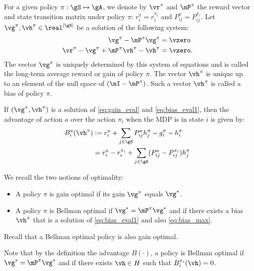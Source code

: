 For a given policy $\pi:\gS\mapsto\gA$, we denote by $\vr^\pi$ and $\mP^\pi$ the reward vector and state transition matrix under policy $\pi$: $r^\pi_i=r^{\pi_i}_{i}$ and $P^\pi_{ij} = P^{\pi_i}_{ij}$. Let $\vg^\pi,\vh^\pi\in\real^{\vert \gS\vert}$ be a solution of the following system:
\begin{align}
    \vg^\pi - \mP^{\pi}\vg^\pi &=\vzero \label{eq:gain_eval}\\
    \vr^{\pi}  - \vg^\pi+\mP^{\pi}\vh^\pi  -\vh^\pi &= \vzero \label{eq:bias_eval1}.
\end{align}
The vector $\vg^\pi$ is uniquely determined by this system of equations and is called the long-term average reward or gain of policy $\pi$. The vector $\vh^\pi$ is unique up to an element of the null space of $(\mI-\mP^\pi)$. Such a vector $\vh^\pi$ is called a bias of policy $\pi$.

If $(\vg^\pi, \vh^\pi)$ is a solution of \eqref{eq:gain_eval} and \eqref{eq:bias_eval1}, then the advantage of action $a$ over the action $\pi_i$ when the MDP is in state $i$ is given by:
\begin{align*}
    B^a_i(\vh^\pi) &:=r^a_i +\sum_{j\in\gS}P^a_{ij}h^\pi_j -g^{\pi}_i -h^\pi_i\\
    &= r^a_i - r^{\pi_i}_i +\sum_{j\in\gS}(P^a_{ij}-P^{\pi_i}_{ij})h^\pi_j
\end{align*}

We recall the two notions of optimality:
\begin{itemize}
    \item A policy $\pi$ is gain optimal if its gain $\vg^\pi$ equals $\vg^*$.
    \item A policy $\pi$ is Bellman optimal if $\vg^*=\mP^\pi \vg^*$ and if there exists a bias $\vh^\pi$ that is a solution of \eqref{eq:bias_eval1} and also \eqref{eq:bias_max}.
\end{itemize}
Recall that a Bellman optimal policy is also gain optimal.

Note that by the definition the advantage $B(\cdot)$, a policy is Bellman optimal if $\vg^*=\mP^\pi \vg^*$ and if there exists $\vh\in H$ such that $B^{\pi_i}_i(\vh)=0$.


